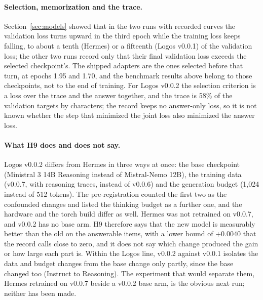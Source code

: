 \paragraph{Selection, memorization and the trace.}
Section~\ref{sec:models} showed that in the two runs with recorded curves the validation loss turns upward in the third epoch while the training loss keeps falling, to about a tenth (Hermes) or a fifteenth (Logos v0.0.1) of the validation loss; the other two runs record only that their final validation loss exceeds the selected checkpoint's. The shipped adapters are the ones selected before that turn, at epochs 1.95 and 1.70, and the benchmark results above belong to those checkpoints, not to the end of training. For Logos v0.0.2 the selection criterion is a loss over the trace and the answer together, and the trace is 58\% of the validation targets by characters; the record keeps no answer-only loss, so it is not known whether the step that minimized the joint loss also minimized the answer loss.

\paragraph{What H9 does and does not say.}
Logos v0.0.2 differs from Hermes in three ways at once: the base checkpoint (Ministral 3 14B Reasoning instead of Mistral-Nemo 12B), the training data (v0.0.7, with reasoning traces, instead of v0.0.6) and the generation budget (1,024 instead of 512 tokens). The pre-registration counted the first two as the confounded changes and listed the thinking budget as a further one, and the hardware and the torch build differ as well. Hermes was not retrained on v0.0.7, and v0.0.2 has no base arm. H9 therefore says that the new model is measurably better than the old on the answerable items, with a lower bound of $+0.0040$ that the record calls close to zero, and it does not say which change produced the gain or how large each part is. Within the Logos line, v0.0.2 against v0.0.1 isolates the data and budget changes from the base change only partly, since the base changed too (Instruct to Reasoning). The experiment that would separate them, Hermes retrained on v0.0.7 beside a v0.0.2 base arm, is the obvious next run; neither has been made.

